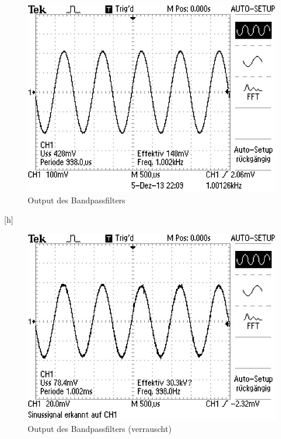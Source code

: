 \documentclass[11pt]{article}
\begin{document}
\begin{figure}[h]
\centering
\includegraphics[scale=0.85]{Bilder/4-sine.png}
\caption{Output des Bandpassfilters }
\label{Abb5}
\end{figure}[h]
\begin{figure}
\centering
\includegraphics[scale=0.85]{Bilder/4-noise.png}
\caption{Output des Bandpassfilters (verrauscht)}
\label{Abb6}
\end{figure}
\end{document}
